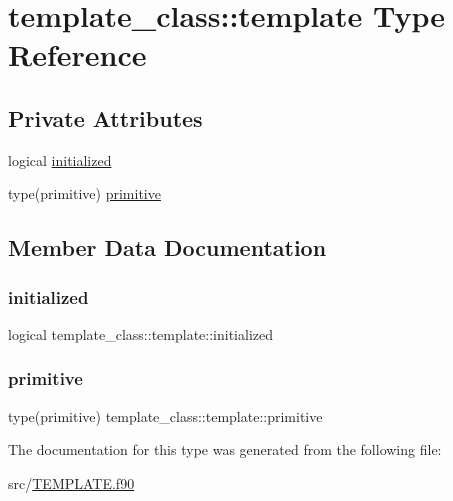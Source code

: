 \hypertarget{structtemplate__class_1_1template}{}\section{template\+\_\+class\+:\+:template Type Reference}
\label{structtemplate__class_1_1template}
\subsection*{Private Attributes}
\begin{DoxyCompactItemize}
\item 
logical \hyperlink{structtemplate__class_1_1template_a298960ed9ac90b343825931d41da48a2}{initialized}
\item 
type(primitive) \hyperlink{structtemplate__class_1_1template_ae6f2d52744f8eddc4cff4eae9d8b366c}{primitive}
\end{DoxyCompactItemize}


\subsection{Member Data Documentation}
\mbox{\label{structtemplate__class_1_1template_a298960ed9ac90b343825931d41da48a2}} 
\subsubsection{\texorpdfstring{initialized}{initialized}}
{\footnotesize\ttfamily logical template\+\_\+class\+::template\+::initialized\hspace{0.3cm}{\ttfamily [private]}}

\mbox{\label{structtemplate__class_1_1template_ae6f2d52744f8eddc4cff4eae9d8b366c}} 
\subsubsection{\texorpdfstring{primitive}{primitive}}
{\footnotesize\ttfamily type(primitive) template\+\_\+class\+::template\+::primitive\hspace{0.3cm}{\ttfamily [private]}}



The documentation for this type was generated from the following file\+:\begin{DoxyCompactItemize}
\item 
src/\hyperlink{_t_e_m_p_l_a_t_e_8f90}{T\+E\+M\+P\+L\+A\+T\+E.\+f90}\end{DoxyCompactItemize}
